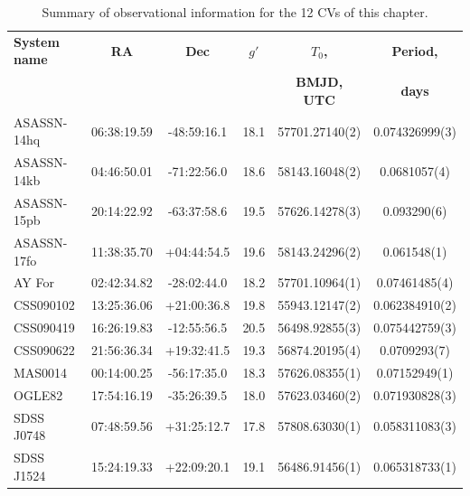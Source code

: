 \newpage
    \begin{table}
        \begin{adjustwidth}{-.5in}{-.5in}
            \centering
            \captionsetup{justification=centering}
            \caption{Summary of observational information for the 12 CVs of this chapter. }
            \begin{tabular}{lccccc}
                \hline
                {\bf System name} & {\bf RA} & {\bf Dec} & {\bf $g'$}      & {\bf $T_0$,}    & {\bf Period,} \\
                                  &          &           &                 & {\bf BMJD, UTC} & {\bf days}      \\
                \hline
                \hline
                ASASSN-14hq     & 06:38:19.59 & -48:59:16.1 & 18.1 & 57701.27140(2) & 0.074326999(3) \\
                ASASSN-14kb     & 04:46:50.01 & -71:22:56.0 & 18.6 & 58143.16048(2) & 0.0681057(4) \\
                ASASSN-15pb     & 20:14:22.92 & -63:37:58.6 & 19.5 & 57626.14278(3) & 0.093290(6) \\
                ASASSN-17fo     & 11:38:35.70 & +04:44:54.5 & 19.6 & 58143.24296(2) & 0.061548(1) \\
                AY For          & 02:42:34.82 & -28:02:44.0 & 18.2 & 57701.10964(1) & 0.07461485(4) \\
                CSS090102       & 13:25:36.06 & +21:00:36.8 & 19.8 & 55943.12147(2) & 0.062384910(2) \\
                CSS090419       & 16:26:19.83 & -12:55:56.5 & 20.5 & 56498.92855(3) & 0.075442759(3) \\
                CSS090622       & 21:56:36.34 & +19:32:41.5 & 19.3 & 56874.20195(4) & 0.0709293(7) \\
                MAS0014         & 00:14:00.25 & -56:17:35.0 & 18.3 & 57626.08355(1) & 0.07152949(1) \\
                OGLE82          & 17:54:16.19 & -35:26:39.5 & 18.0 & 57623.03460(2) & 0.071930828(3) \\
                SDSS J0748      & 07:48:59.56 & +31:25:12.7 & 17.8 & 57808.63030(1) & 0.058311083(3) \\
                SDSS J1524      & 15:24:19.33 & +22:09:20.1 & 19.1 & 56486.91456(1) & 0.065318733(1) \\
                \hline
            \end{tabular}
        \end{adjustwidth}
    \end{table}


